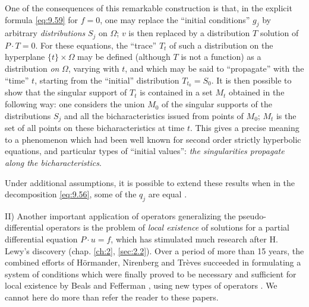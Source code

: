 \documentclass[12pt,a4paper,leqno,twoside]{extbook}
\begin{document}
One of the consequences of this remarkable construction is that, in the explicit formula \eqref{eq:9.59} for \(f = 0\), one may replace the ``initial conditions'' \(g_j\) by arbitrary \emph{distributions} \(S_j\) on \(\Omega\); \(v\) is then replaced by a distribution \(T\) solution of \(P \cdot T = 0\). For these equations, the ``trace'' \(T_t\) of such a distribution on the hyperplane \(\{t\} \times \Omega\) may be defined (although \(T\) is not a function) as a distribution \emph{on} \(\Omega\), varying with \(t\), and which may be said to ``propagate'' with the ``time'' \(t\), starting from the ``initial'' distribution \(T_{t_0} = S_0\). It is then possible to show that the singular support of \(T_t\) is contained in a set \(M_t\) obtained in the following way: one considers the union \(M_0\) of the singular supports of the distributions \(S_j\) and all the bicharacteristics issued from points of \(M_0\); \(M_t\) is the set of all points on these bicharacteristics at time \(t\). This gives a precise meaning to a phenomenon which had been well known for second order strictly hyperbolic equations, and particular types of ``initial values'': \emph{the singularities propagate along the bicharacteristics}.

Under additional assumptions, it is possible to extend these results when in the decomposition \eqref{eq:9.56}, some of the \(q_j\) are equal \cite{041}.

II) Another important application of operators generalizing the pseudo-differential operators is the problem of \emph{local existence} of solutions for a partial differential equation \(P \cdot u = f\), which has stimulated much research after H. Lewy's discovery (chap. \ref{ch:2}, \ref{sec:2.2}). Over a period of more than 15 years, the combined efforts of Hörmander, Nirenberg and Trèves succeeded in formulating a system of conditions which were finally proved to be necessary and sufficient for local existence by Beals and Fefferman \cite{020}, using new types of operators \cite{019}. We cannot here do more than refer the reader to these papers.

\clearpage


\nocite{*}
\printbibliography[heading=bibintoc,title=References,notkeyword={noprint}]
\end{document}
